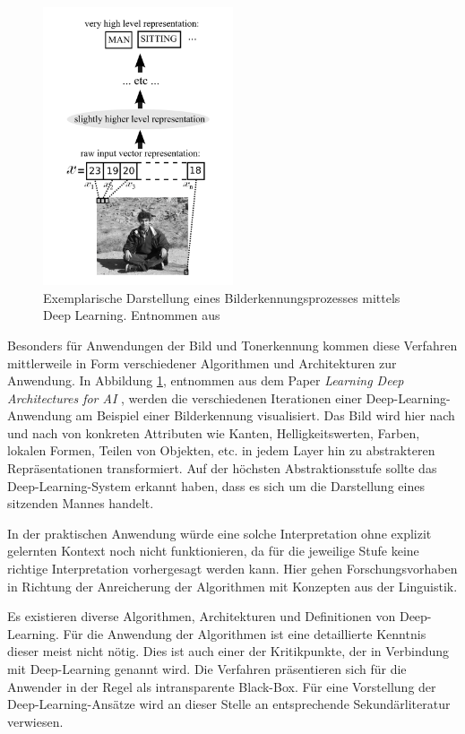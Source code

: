\begin{figure}[htb!]
\centering
\includegraphics[width=0.5\textwidth]{bilder/deeplearning.png}
\caption{Exemplarische Darstellung eines Bilderkennungsprozesses mittels Deep Learning. Entnommen aus \protect{}}
\label{fig:deeplearning}
\end{figure}    


Besonders für Anwendungen der Bild und Tonerkennung kommen diese Verfahren mittlerweile in Form verschiedener Algorithmen und Architekturen zur Anwendung. In Abbildung \ref{fig:deeplearning}, entnommen aus dem Paper \textit{Learning Deep Architectures for AI} , werden die verschiedenen Iterationen einer Deep-Learning-Anwendung am Beispiel einer Bilderkennung visualisiert. Das Bild wird hier nach und nach von konkreten Attributen wie Kanten, Helligkeitswerten, Farben, lokalen Formen, Teilen von Objekten, etc. in jedem Layer hin zu abstrakteren Repräsentationen transformiert. Auf der höchsten Abstraktionsstufe sollte das Deep-Learning-System erkannt haben, dass es sich um die Darstellung eines sitzenden Mannes handelt.      


In der praktischen Anwendung würde eine solche Interpretation ohne explizit gelernten Kontext noch nicht funktionieren, da für die jeweilige Stufe keine richtige Interpretation vorhergesagt werden kann. Hier gehen Forschungsvorhaben in Richtung der Anreicherung der Algorithmen mit Konzepten aus der Linguistik. 

Es existieren diverse Algorithmen, Architekturen und Definitionen von Deep-Learning. Für die Anwendung der Algorithmen ist eine detaillierte Kenntnis dieser meist nicht nötig. Dies ist auch einer der Kritikpunkte, der in Verbindung mit Deep-Learning genannt wird. Die Verfahren präsentieren sich für die Anwender in der Regel als intransparente Black-Box. Für eine Vorstellung der Deep-Learning-Ansätze wird an dieser Stelle an entsprechende Sekundärliteratur verwiesen. 

